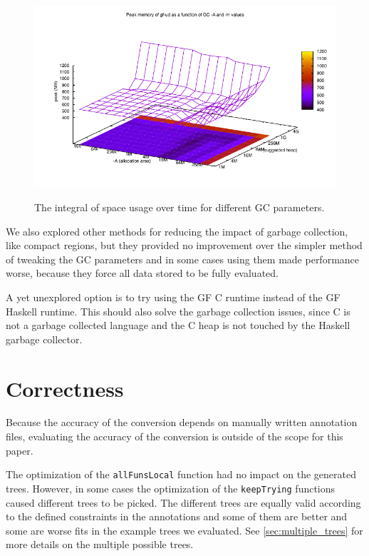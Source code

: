 \begin{figure}
      {\includegraphics[scale=0.5]{figure/gf-ud-peak-gc-space.pdf}}
    \caption{The integral of space usage over time for different GC parameters.}
    \label{fig:gf-ud-integ-gc-space}
\end{figure}

We also explored other methods for reducing the impact of garbage collection, like compact regions\cite{yang2015efficient}, but they provided no improvement over the simpler method of tweaking the GC parameters and in some cases using them made performance worse, because they force all data stored to be fully evaluated.

\clearpage
A yet unexplored option is to try using the GF C runtime instead of the GF Haskell runtime. This should also solve the garbage collection issues, since C is not a garbage collected language and the C heap is not touched by the Haskell garbage collector.

\section{Correctness}

Because the accuracy of the conversion depends on manually written annotation files, evaluating the accuracy of the conversion is outside of the scope for this paper.

The optimization of the \texttt{allFunsLocal} function had no impact on the generated trees. However, in some cases the optimization of the \texttt{keepTrying} functions caused different trees to be picked. The different trees are equally valid according to the defined constraints in the annotations and some of them are better and some are worse fits in the example trees we evaluated. See \autoref{sec:multiple_trees} for more details on the multiple possible trees.


